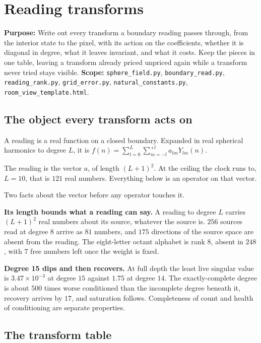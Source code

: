 \chapter{Reading transforms}

\textbf{Purpose:} Write out every transform a boundary reading passes through, from the interior state to the pixel, with its action on the coefficients, whether it is diagonal in degree, what it leaves invariant, and what it costs. Keep the pieces in one table, leaving a transform already priced unpriced again while a transform never tried stays visible. \textbf{Scope:} \texttt{sphere\_field.py}, \texttt{boundary\_read.py}, \texttt{reading\_rank.py}, \texttt{grid\_error.py}, \texttt{natural\_constants.py}, \texttt{room\_view\_template.html}.

\section{The object every transform acts on}

A reading is a real function on a closed boundary. Expanded in real spherical harmonics to degree \(L\), it is \(f(n) = \sum_{l=0}^{L} \sum_{m=-l}^{+l} a_{lm} Y_{lm}(n)\).

The reading is the vector \(a\), of length \((L+1)^2\). At the ceiling the clock runs to, \(L = 10\), that is \(121\) real numbers. Everything below is an operator on that vector.

Two facts about the vector before any operator touches it.

\textbf{Its length bounds what a reading can say.} A reading to degree \(L\) carries \((L+1)^2\) real numbers about its source, whatever the source is. \(256\) sources read at degree \(8\) arrive as \(81\) numbers, and \(175\) directions of the source space are absent from the reading. The eight-letter octant alphabet is rank \(8\), absent in \(248\), with \(7\) free numbers left once the weight is fixed.

\textbf{Degree 15 dips and then recovers.} At full depth the least live singular value is \(3.47 \times 10^{-3}\) at degree \(15\) against \(1.75\) at degree \(14\). The exactly-complete degree is about \(500\) times worse conditioned than the incomplete degree beneath it, recovery arrives by \(17\), and saturation follows. Completeness of count and health of conditioning are separate properties.

\section{The transform table}


